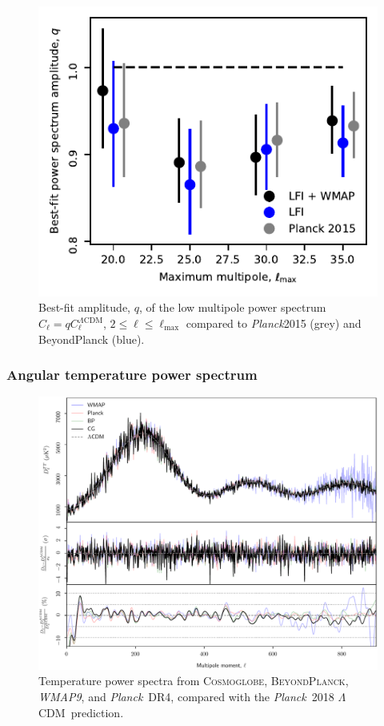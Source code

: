 \documentclass[twocolumn]{../../common/aa}
\def\WMAPnine{\emph{WMAP9}}
\def\planck{\emph{Planck}}
\def\Planck{\emph{Planck}}
\def\LCDM{$\Lambda$CDM}
\newcommand{\bp}{\textsc{BeyondPlanck}}
\newcommand{\cosmoglobe}{\textsc{Cosmoglobe}}
\begin{document}
\begin{figure}
	\includegraphics[width=\columnwidth]{figures/WMAP_best_q_fit.pdf}
	\caption{Best-fit amplitude, $q$, of the low multipole power spectrum $C_{\ell} = q C^{\Lambda \mathrm{CDM}}_{\ell}$, $2 \leq \ell \leq \ell_{\mathrm{max}}$ compared to \planck 2015 (grey) and BeyondPlanck (blue).}
\end{figure}




\subsubsection{Angular temperature power spectrum}
\label{sec:cls}

\begin{figure}
	\includegraphics[width=\textwidth]{figures/cl_TT_CG_v1.pdf}
	\caption{Temperature power spectra from \cosmoglobe, \bp, \WMAPnine, and \Planck\ DR4, compared with the \Planck\ 2018 \LCDM\ prediction.}
\end{figure}
\end{document}
